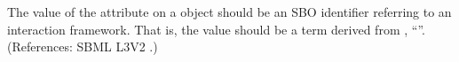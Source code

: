 The value of the attribute  on a \Reaction object should be
an SBO identifier referring to an interaction framework.  That is, the
value should be a term derived from \sbointeractionID, ``''.
(References: SBML L3V2 .)
